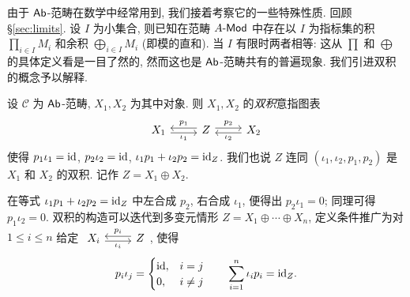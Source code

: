 由于 $\mathsf{Ab}$-范畴在数学中经常用到, 我们接着考察它的一些特殊性质. 回顾 \S\ref{sec:limits}. 设 $I$ 为小集合, 则已知在范畴 $A\text{-}\mathsf{Mod}$ 中存在以 $I$ 为指标集的积 $\prod_{i \in I} M_i$ 和余积 $\bigoplus_{i \in I} M_i$ (即模的直和). 当 $I$ 有限时两者相等: 这从 $\prod$ 和 $\bigoplus$ 的具体定义看是一目了然的, 然而这也是 $\mathsf{Ab}$-范畴共有的普遍现象. 我们引进双积的概念予以解释.

\begin{definition}\label{def:biproduct}
	设 $\mathcal{C}$ 为 $\mathsf{Ab}$-范畴, $X_1, X_2$ 为其中对象. 则 $X_1, X_2$ 的\emph{双积}意指图表
	\[ \begin{tikzcd}
		X_1 \arrow[r, yshift=-0.5ex, "\iota_1"'] & Z \arrow[l, yshift=0.5ex, "p_1"'] \arrow[r, yshift=0.5ex, "p_2"] & X_2 \arrow[l, yshift=-0.5ex, "\iota_2"]
	\end{tikzcd} \]
	使得 $p_1 \iota_1 = \mathrm{id}$, $p_2 \iota_2 = \mathrm{id}$, $\iota_1 p_1 + \iota_2 p_2 = \mathrm{id}_Z$. 我们也说 $Z$ 连同 $(\iota_1, \iota_2, p_1, p_2)$ 是 $X_1$ 和 $X_2$ 的双积. 记作 $Z = X_1 \oplus X_2$.
\end{definition}
在等式 $\iota_1 p_1 + \iota_2 p_2 = \mathrm{id}_Z$ 中左合成 $p_2$, 右合成 $\iota_1$, 便得出 $p_2 \iota_1 = 0$; 同理可得 $p_1 \iota_2 = 0$. 双积的构造可以迭代到多变元情形 $Z = X_1 \oplus \cdots \oplus X_n$, 定义条件推广为对 $1 \leq i \leq n$ 给定 $\begin{tikzcd} X_i \arrow[r, yshift=-0.5ex, "\iota_i"'] & Z \arrow[l, yshift=0.5ex, "p_i"'] \end{tikzcd}$, 使得
\begin{gather*}
	p_i \iota_j = \begin{cases} \mathrm{id}, & i=j \\ 0, & i \neq j \end{cases} \qquad
	\sum_{i=1}^n \iota_i p_i = \mathrm{id}_Z.
\end{gather*}

